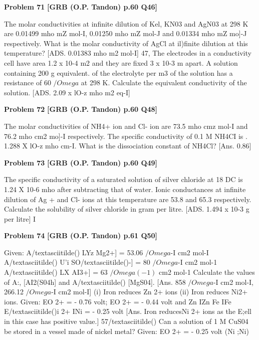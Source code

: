 \begin{problembox}
\textbf{Problem 71} \hfill \textbf{[GRB (O.P. Tandon) p.60 Q46]}
\label{q:ext-grb_all_questions-71}

The molar conductivities at infinite dilution of Kel, 
KN03 and AgN03 at 298 K are 0.01499 mho mZ mol-I, 
0.01250 mho mZ mol-J and 0.01334 mho mZ mo]-J 
respectively. What is the molar conductivity of AgCl at 
il)finite dilution at this temperature? 
[ADS. 
0.01383 mho m2 mol-I] 
47, The electrodes in a conductivity cell have area 1.2 x 10-4 m2 
and they are fixed 3 x 10-3 m apart. A solution containing 200 
g equivalent. of the electrolyte per m3 of the solution has a 
resistance of 60 $/Omega$ at 298 K. Calculate the equivalent 
conductivity of the solution. 
[ADS. 
2.09 x lO-z mho m2 eq-I]
\end{problembox}

\begin{problembox}
\textbf{Problem 72} \hfill \textbf{[GRB (O.P. Tandon) p.60 Q48]}
\label{q:ext-grb_all_questions-72}

The molar conductivities of NH4+ ion and Cl- ion are 73.5 
mho cmz mol-I and 76.2 mho cm2 mo]-I respectively. The 
specific 
conductivity 
of 
0.1 
M 
NH4CI 
is 
. 1.288 X lO-z mho cm-I. What is the dissociation constant of 
NH4Cl? 
[Ans. 
0.86]
\end{problembox}

\begin{problembox}
\textbf{Problem 73} \hfill \textbf{[GRB (O.P. Tandon) p.60 Q49]}
\label{q:ext-grb_all_questions-73}

The specific conductivity of a saturated solution of silver 
chloride at 18 DC is 1.24 X 10-6 mho after subtracting that of 
water. Ionic conductances at infinite dilution of Ag + and Cl-
ions at this temperature are 53.8 and 65.3 respectively. 
Calculate the solubility of silver chloride in gram per litre. 
[ADS. 
1.494 x 10-3 g per litre] 
I
\end{problembox}

\begin{problembox}
\textbf{Problem 74} \hfill \textbf{[GRB (O.P. Tandon) p.61 Q50]}
\label{q:ext-grb_all_questions-74}

Given: 
A/textasciitilde() LYz Mg2+] = 53.06 $/Omega$-I cm2 mol-I 
A/textasciitilde() U'i SO/textasciitilde()-] = 80 $/Omega$-I cm2 mol-1 
A/textasciitilde() LX AI3+] = 63 $/Omega(-1)$ cm2 mol-1 
Calculate the values of A:, [AI2(S04h] and A/textasciitilde() [MgS04]. 
[Ans. 858 $/Omega$-I cm2 mol-I, 266.12 $/Omega$-I cm2 mol-I] 
(i) Iron reduces Zn 2+ ions (ii) Iron reduces Ni2+ ions. 
Given: EO 2+ 
= - 0.76 volt; EO 2+ 
= - 0.44 volt and 
Zn 
IZn 
Fe 
IFe 
E/textasciitilde()i 2+ INi = - 0.25 volt 
[Ans. Iron reducesNi 2+ ions as the E;ell in this case has positive 
value.] 
57/textasciitilde() Can a solution of 1 M CuS04 be stored in a vessel made of 
nickel metal? 
Given: 
EO 2+ 
= - 0.25 volt 
(Ni 
;Ni)
\end{problembox}

